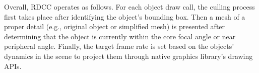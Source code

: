 Overall, RDCC operates as follows. For each object draw call, the culling process first takes place after identifying the object's bounding box. Then a mesh of 
a proper detail (e.g., original object or simplified mesh) is presented 
after determining that the object is currently within the core focal angle or near 
peripheral angle. Finally, the target frame rate is set 
based on the objects' dynamics in the scene to project them through native graphics 
library's drawing APIs.


%
%


%





%
%
%


